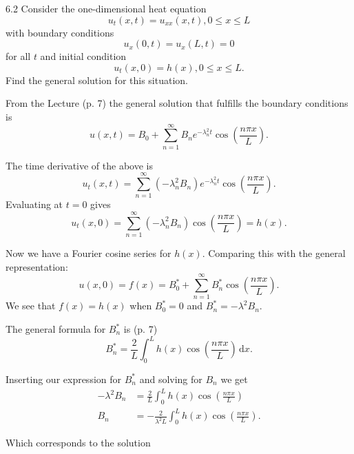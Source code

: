 
\begin{problem}{6.2}
  Consider the one-dimensional heat equation
\[ 
u_t (x,t) = u_{x x}(x,t), 0 \leq x \leq L
\]
with boundary conditions
\[ 
u_x(0,t) = u_x(L, t) = 0
\]
for all $t$ and initial condition
\[ 
u_t(x, 0) = h(x), 0 \leq x \leq L
.\]
Find the general solution for this situation.
\end{problem}

\begin{derivation}
  From the Lecture (p. 7) the general solution that fulfills the boundary conditions is
  \begin{equation*}
    u(x,t) = B_0 + \sum_{n = 1}^{\infty} B_n e^{-\lambda_n^2 t} \cos \left( \frac{n \pi x}{L} \right)
  .\end{equation*}

  The time derivative of the above is
  \begin{equation*}
    u_t(x,t) = \sum_{n =1}^{\infty} (- \lambda_n^2 B_n)e^{-\lambda_n^2 t} \cos \left( \frac{n \pi x}{L} \right)
  .\end{equation*}
  Evaluating at $t = 0$ gives
  \begin{equation*}
    u_t(x,0) = \sum_{n = 1}^{\infty} \left( - \lambda_n^2 B_n \right) \cos \left( \frac{n \pi x}{L} \right) = h(x)
  .\end{equation*}

  Now we have a Fourier cosine series for $h(x)$.
  Comparing this with the general representation:
  \begin{equation*}
    u(x,0) = f(x) = B^{*}_0 + \sum_{n = 1}^{\infty} B^{*}_n \cos \left( \frac{n \pi x}{L} \right)
  .\end{equation*}
  We see that $f(x) = h(x)$ when $B^{*}_0 = 0$ and $B_n^{*} = -\lambda^2 B_n$.

  The general formula for $B_n^{*}$ is (p. 7)
  \begin{equation*}
    B^{*}_n = \frac{2}{L} \int_{0}^{L} h(x) \cos \left( \frac{n \pi x}{L} \right) \, \mathrm{d}x 
  .\end{equation*}
  
  Inserting our expression for $B_n^{*}$ and solving for $B_n$ we get
  \begin{align*}
    -\lambda^2 B_n &= \frac{2}{L} \int_{0}^{L} h(x) \cos \left( \frac{n \pi x}{L} \right) \\
    B_n &= -\frac{2}{\lambda^2 L} \int_{0}^{L} h(x) \cos \left( \frac{n \pi x}{L} \right)
  .\end{align*}
  
  Which corresponds to the solution
\end{derivation}

